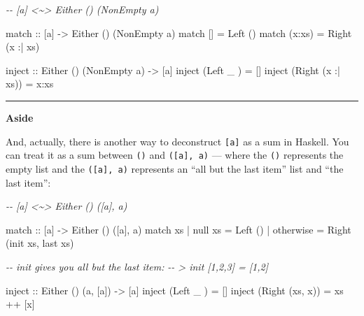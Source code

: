 \documentclass[]{article}
\newenvironment{Shaded}{}{}
\newcommand{\CommentTok}[1]{\textcolor[rgb]{0.38,0.63,0.69}{\textit{#1}}}
\newcommand{\DataTypeTok}[1]{\textcolor[rgb]{0.56,0.13,0.00}{#1}}
\newcommand{\FunctionTok}[1]{\textcolor[rgb]{0.02,0.16,0.49}{#1}}
\newcommand{\NormalTok}[1]{#1}
\newcommand{\OperatorTok}[1]{\textcolor[rgb]{0.40,0.40,0.40}{#1}}
\newcommand{\OtherTok}[1]{\textcolor[rgb]{0.00,0.44,0.13}{#1}}
\begin{document}
\begin{Shaded}
\begin{Highlighting}[]
\CommentTok{{-}{-} [a] <\textasciitilde{}> Either () (NonEmpty a)}

\OtherTok{match ::}\NormalTok{ [a] }\OtherTok{{-}>} \DataTypeTok{Either}\NormalTok{ () (}\DataTypeTok{NonEmpty}\NormalTok{ a)}
\NormalTok{match []     }\OtherTok{=} \DataTypeTok{Left}\NormalTok{  ()}
\NormalTok{match (x}\OperatorTok{:}\NormalTok{xs) }\OtherTok{=} \DataTypeTok{Right}\NormalTok{ (x }\OperatorTok{:|}\NormalTok{ xs)}

\OtherTok{inject ::} \DataTypeTok{Either}\NormalTok{ () (}\DataTypeTok{NonEmpty}\NormalTok{ a) }\OtherTok{{-}>}\NormalTok{ [a]}
\NormalTok{inject (}\DataTypeTok{Left}\NormalTok{   \_       ) }\OtherTok{=}\NormalTok{ []}
\NormalTok{inject (}\DataTypeTok{Right}\NormalTok{ (x }\OperatorTok{:|}\NormalTok{ xs)) }\OtherTok{=}\NormalTok{ x}\OperatorTok{:}\NormalTok{xs}
\end{Highlighting}
\end{Shaded}

\begin{center}\rule{0.5\linewidth}{\linethickness}\end{center}

\textbf{Aside}

And, actually, there is another way to deconstruct \texttt{{[}a{]}} as a sum in
Haskell. You can treat it as a sum between \texttt{()} and
\texttt{({[}a{]},\ a)} --- where the \texttt{()} represents the empty list and
the \texttt{({[}a{]},\ a)} represents an ``all but the last item'' list and
``the last item'':

\begin{Shaded}
\begin{Highlighting}[]
\CommentTok{{-}{-} [a] <\textasciitilde{}> Either () ([a], a)}

\OtherTok{match  ::}\NormalTok{ [a] }\OtherTok{{-}>} \DataTypeTok{Either}\NormalTok{ () ([a], a)}
\NormalTok{match xs}
  \OperatorTok{|} \FunctionTok{null}\NormalTok{ xs   }\OtherTok{=} \DataTypeTok{Left}\NormalTok{  ()}
  \OperatorTok{|} \FunctionTok{otherwise} \OtherTok{=} \DataTypeTok{Right}\NormalTok{ (}\FunctionTok{init}\NormalTok{ xs, }\FunctionTok{last}\NormalTok{ xs)}

\CommentTok{{-}{-} init gives you all but the last item:}
\CommentTok{{-}{-} > init [1,2,3] = [1,2]}

\OtherTok{inject ::} \DataTypeTok{Either}\NormalTok{ () (a, [a]) }\OtherTok{{-}>}\NormalTok{ [a]}
\NormalTok{inject (}\DataTypeTok{Left}\NormalTok{   \_     ) }\OtherTok{=}\NormalTok{ []}
\NormalTok{inject (}\DataTypeTok{Right}\NormalTok{ (xs, x)) }\OtherTok{=}\NormalTok{ xs }\OperatorTok{++}\NormalTok{ [x]}
\end{Highlighting}
\end{Shaded}
\end{document}
